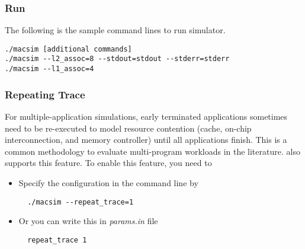 \subsubsection{Run}

The following is the sample command lines to run \SIM simulator.

\smallskip
\begin{lstlisting}
./macsim [additional commands]
./macsim --l2_assoc=8 --stdout=stdout --stderr=stderr
./macsim --l1_assoc=4 
\end{lstlisting}
\smallskip



\subsubsection{Repeating Trace}

For multiple-application simulations, early terminated applications
sometimes need to be re-executed to model resource contention (cache,
on-chip interconnection, and memory controller) until all applications
finish. This is a common methodology to evaluate multi-program
workloads in the literature. \SIM also supports this feature. To
enable this feature, you need to

\begin{itemize}
  \item Specify the configuration in the command line by
  \smallskip
  \begin{lstlisting}
  ./macsim --repeat_trace=1
  \end{lstlisting}
  \smallskip

  \item Or you can write this in \textit{params.in} file
  \smallskip
  \begin{lstlisting}
  repeat_trace 1
  \end{lstlisting}
  \smallskip
\end{itemize}



 

